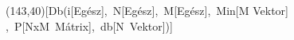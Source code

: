 \begin{struktogramm}(143,40)[{Db(i[Egész],\ N[Egész],\ M[Egész],\ Min[M Vektor] ,\ P[NxM\ Mátrix],\ db[N\ Vektor])}]
   \change
   \ifend
  \whileend
\end{struktogramm}
